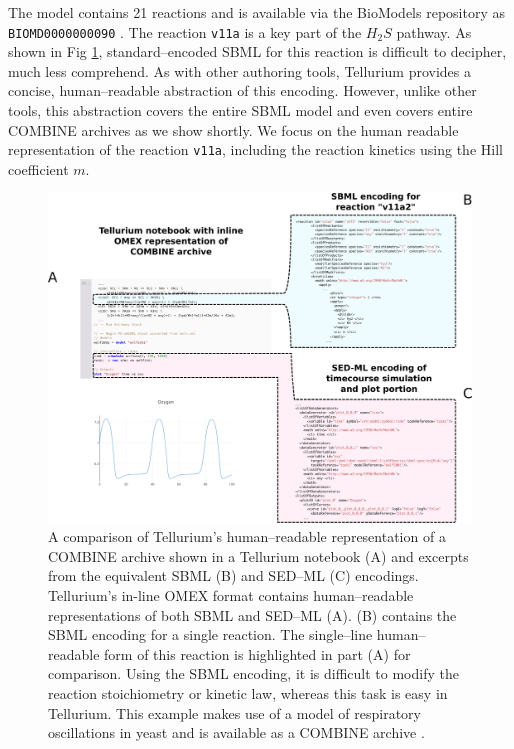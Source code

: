 \documentclass[10pt,letterpaper]{article}
\begin{document}
The model contains 21 reactions and is available via the BioModels repository as \texttt{BIOMD0000000090} \cite{wolfbiomod}. The reaction \texttt{v11a} is a key part of the $H_2S$ pathway. As shown in Fig  \ref{fig:comparison}, standard--encoded SBML for this reaction is difficult to decipher, much less comprehend. As with other authoring tools, Tellurium provides a concise, human--readable abstraction of this encoding. However, unlike other tools, this abstraction covers the entire SBML model and even covers entire COMBINE archives as we show shortly. We focus on the human readable representation of the reaction \texttt{v11a}, including the reaction kinetics using the Hill coefficient $m$.

\begin{figure}
  \includegraphics[width=\textwidth]{fig-comparison2.pdf}
  \caption{A comparison of Tellurium's human--readable representation of a COMBINE archive shown in a Tellurium notebook (A) and excerpts from the equivalent SBML (B) and SED--ML (C) encodings. Tellurium's in-line OMEX format contains human--readable representations of both SBML and SED--ML (A). (B) contains the SBML encoding for a single reaction. The single--line human--readable form of this reaction is highlighted in part (A) for comparison. Using the SBML encoding, it is difficult to modify the reaction stoichiometry or kinetic law, whereas this task is easy in Tellurium. This example makes use of a model of respiratory oscillations in yeast \cite{wolf2001mathematical} and is available as a COMBINE archive \cite{wolfoxy}. }
  \label{fig:comparison}
\end{figure}
\end{document}
